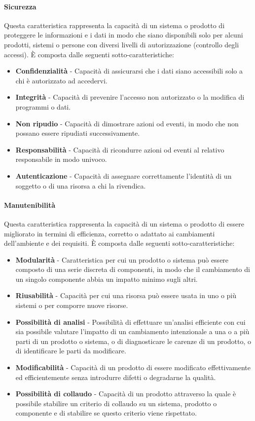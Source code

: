 \documentclass[../main.tex]{subfiles}
\begin{document}
\paragraph{Sicurezza}
Questa caratteristica rappresenta la capacità di un sistema o prodotto di proteggere le informazioni e i dati in modo che siano disponibili solo per alcuni prodotti, sistemi o persone con diversi livelli di autorizzazione (controllo degli accessi).
È composta dalle seguenti sotto-caratteristiche:
\begin{itemize}
\item \textbf{Confidenzialità} - Capacità di assicurarsi che i dati siano accessibili solo a chi è autorizzato ad accedervi.
\item \textbf{Integrità} - Capacità di prevenire l'accesso non autorizzato o la modifica di programmi o dati.
\item \textbf{Non ripudio} - Capacità di dimostrare azioni od eventi, in modo che non possano essere ripudiati successivamente.
\item \textbf{Responsabilità} - Capacità di ricondurre azioni od eventi al relativo responsabile in modo univoco.
\item \textbf{Autenticazione} - Capacità di assegnare correttamente l'identità di un soggetto o di una risorsa a chi la rivendica.
\end{itemize}


\paragraph{Manutenibilità}
Questa caratteristica rappresenta la capacità di un sistema o prodotto di essere migliorato in termini di efficienza, corretto o adattato ai cambiamenti dell'ambiente e dei requisiti.
È composta dalle seguenti sotto-caratteristiche:
\begin{itemize}
\item \textbf{Modularità} - Caratteristica per cui un prodotto o sistema può essere composto di una serie discreta di componenti, in modo che il cambiamento di un singolo componente abbia un impatto minimo sugli altri. 
\item \textbf{Riusabilità} - Capacità per cui una risorsa può essere usata in uno o più sistemi o per comporre nuove risorse.
\item \textbf{Possibilità di analisi} - Possibilità di effettuare un'analisi efficiente con cui sia possibile valutare l'impatto di un cambiamento intenzionale a una o a più parti di un prodotto o sistema, o di diagnosticare le carenze di un prodotto, o di identificare le parti da modificare.
\item \textbf{Modificabilità} - Capacità di un prodotto di essere modificato effettivamente ed efficientemente senza introdurre difetti o degradarne la qualità.
\item \textbf{Possibilità di collaudo} - Capacità di un prodotto attraverso la quale è possibile stabilire un criterio di collaudo su un sistema, prodotto o componente e di stabilire se questo criterio viene rispettato.
\end{itemize}
\end{document}
